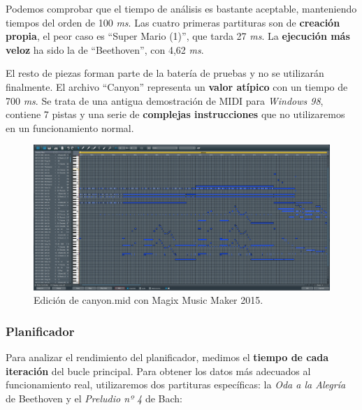 \smallskip

Podemos comprobar que el tiempo de análisis es bastante aceptable, manteniendo tiempos del orden de 100 \textit{ms}. Las cuatro primeras partituras son de \textbf{creación propia}, el peor caso es ``Super Mario (1)'', que tarda 27 \textit{ms}. La \textbf{ejecución más veloz} ha sido la de ``Beethoven'', con 4,62 \textit{ms}.

El resto de piezas forman parte de la batería de pruebas y no se utilizarán finalmente. El archivo ``Canyon'' representa un \textbf{valor atípico} con un tiempo de 700 \textit{ms}. Se trata de una antigua demostración de \acrshort{MIDI} para \textit{Windows 98}, contiene 7 pistas y una serie de \textbf{complejas instrucciones} que no utilizaremos en un funcionamiento normal.

\smallskip

\begin{figure}[H]
	\noindent \begin{centering}
		\includegraphics[width=\linewidth*3/4]{capitulo6/cap_canyon}
		\par\end{centering}
	\smallskip
	\caption{\label{fig:cap_canyon} Edición de canyon.mid con Magix Music Maker 2015.}
\end{figure} 

\smallskip

\subsubsection{Planificador}

Para analizar el rendimiento del planificador, medimos el \textbf{tiempo de cada iteración} del bucle principal. Para obtener los datos más adecuados al funcionamiento real, utilizaremos dos partituras específicas: la \textit{Oda a la Alegría} de Beethoven y el \textit{Preludio nº 4} de Bach:


